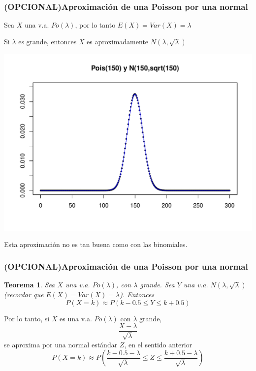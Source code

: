 \documentclass[handout]{beamer}\usepackage[]{graphicx}\usepackage[]{color}
\makeatletter
\def\maxwidth{ %
  \ifdim\Gin@nat@width>\linewidth
    \linewidth
  \else
    \Gin@nat@width
  \fi
}
\newenvironment{knitrout}{}{} %
\renewcommand{\leq}{\leqslant}
\theoremstyle{plain}
\newtheorem{teorema}{Teorema}
\theoremstyle{definition}
\makeatother
\begin{document}
\begin{frame}
\frametitle{(OPCIONAL)Aproximación de una Poisson por una normal}
\vspace*{-1ex}

Sea  $X$ una v.a. $Po(\lambda)$, por lo tanto $E(X)=Var(X)=\lambda$
\medskip

Si $\lambda$ es grande, entonces $X$ es aproximadamente $N(\lambda,\sqrt{\lambda})$
\vspace*{-1ex}


\begin{knitrout}
\color{fgcolor}
\includegraphics[width=\maxwidth]{figure/unnamed-chunk-6-1} 

\end{knitrout}



Esta aproximación no es tan buena como con las binomiales.
\end{frame}


\begin{frame}



\frametitle{(OPCIONAL)Aproximación de una Poisson por una normal}


\begin{teorema}
Sea  $X$ una v.a. $Po(\lambda)$, con  $\lambda$ grande. Sea $Y$ una v.a. $N(\lambda,\sqrt{\lambda})$ (recordar que $E(X)\!=\!Var(X)\!=\!\lambda$). Entonces 
$$
P(X=k)\approx  P\left(k-0.5\leq Y\leq k+0.5\right)
$$
\end{teorema}
Por lo tanto, si $X$ es una v.a. $Po(\lambda)$ con $\lambda$ grande,
$$
\frac{X-\lambda}{\sqrt{\lambda}}
$$
se aproxima por una normal estándar $Z$, en  el sentido anterior
$$
P(X=k) \approx P\left(\dfrac{k-0.5-\lambda}{\sqrt{\lambda}}
\leq Z \leq \dfrac{k+0.5-\lambda}{\sqrt{\lambda}}\right)
$$

\end{frame}
\end{document}
